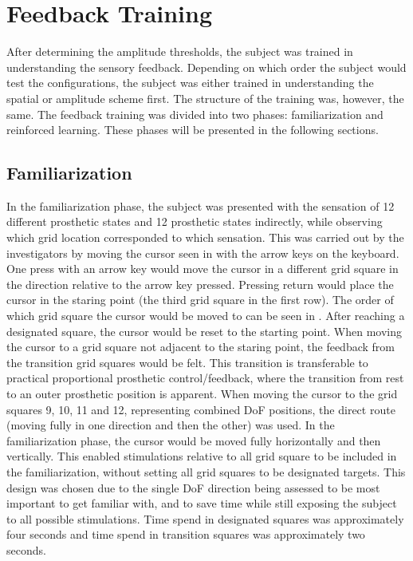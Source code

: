 
\section{Feedback Training}
After determining the amplitude thresholds, the subject was trained in understanding the sensory feedback. Depending on which order the subject would test the configurations, the subject was either trained in understanding the spatial or amplitude scheme first. The structure of the training was, however, the same. The feedback training was divided into two phases: familiarization and reinforced learning. These phases will be presented in the following sections.

\subsection{Familiarization} \label{sec:meth:FBtrainingFam}
In the familiarization phase, the subject was presented with the sensation of 12 different prosthetic states and 12 prosthetic states indirectly, while observing which grid location corresponded to which sensation. This was carried out by the investigators by moving the cursor seen in  with the arrow keys on the keyboard. One press with an arrow key would move the cursor in a different grid square in the direction relative to the arrow key pressed. Pressing return would place the cursor in the staring point (the third grid square in the first row). The order of which grid square the cursor would be moved to can be seen in . After reaching a designated square, the cursor would be reset to the starting point. When moving the cursor to a grid square not adjacent to the staring point, the feedback from the transition grid squares would be felt. This transition is transferable to practical proportional prosthetic control/feedback, where the transition from rest to an outer prosthetic position is apparent. When moving the cursor to the grid squares 9, 10, 11 and 12, representing combined DoF positions, the direct route (moving fully in one direction and then the other) was used. In the familiarization phase, the cursor would be moved fully horizontally and then vertically. This enabled stimulations relative to all grid square to be included in the familiarization, without setting all grid squares to be designated targets. This design was chosen due to the single DoF direction being assessed to be most important to get familiar with, and to save time while still exposing the subject to all possible stimulations. Time spend in designated squares was approximately four seconds and time spend in transition squares was approximately two seconds.

